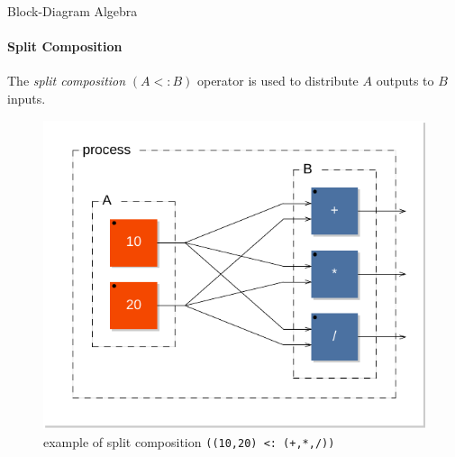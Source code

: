 \begin{frame}[fragile]{Block-Diagram Algebra}
\framesubtitle{Split Composition}
The \emph{split composition} $(A<:B)$ operator is used to distribute $A$ outputs
to $B$ inputs.

\begin{figure}[h]
\centering 
\includegraphics[scale=0.5]{images/split1} 
\caption{example of split composition   \lstinline'((10,20) <: (+,*,/))'}  
\label{figure:split1}
\end{figure}

\end{frame}


